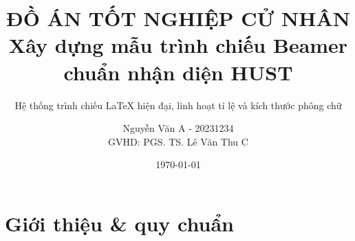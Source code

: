 \documentclass[aspectratio=169,10pt]{beamer}
\title[Xây dựng mẫu trình chiếu Beamer chuẩn nhận diện HUST]{{\normalsize ĐỒ ÁN TỐT NGHIỆP CỬ NHÂN}\\[5pt] {\bfseries Xây dựng mẫu trình chiếu Beamer chuẩn nhận diện HUST}}
\subtitle{Hệ thống trình chiếu LaTeX hiện đại, linh hoạt tỉ lệ và kích thước phông chữ}
\author[Nguyễn Văn A]{Nguyễn Văn A - 20231234 \\ GVHD: PGS. TS. Lê Văn Thu C}
\institute{Khoa Toán - Tin,\\Đại học Bách khoa Hà Nội}
\date{\today}
\begin{document}
\begin{hustwelcomeframe}
\end{hustwelcomeframe}

\begin{hustwelcomeframe}[bg=background, footer={DEMO SHOWCASE}]
\end{hustwelcomeframe}

\begin{frame}
  \titlepage
\end{frame}

\begin{frame}[noprogressbar]{\husttoctitle}{\husttocsubtitle}
  \tableofcontents[split=3,hideallsubsections]
\end{frame}

\section[Quy chuẩn]{Giới thiệu \& quy chuẩn}
\end{document}
